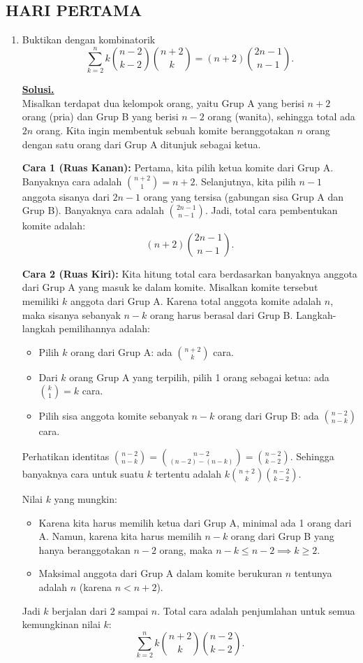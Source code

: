 \documentclass[12pt,twoside]{article}
\newenvironment{solution}
{
	\par\noindent\textbf{\underline{Solusi.}}\\
}
{
	\par
}
\begin{document}
\subsection{HARI PERTAMA}
\begin{enumerate}
  \item Buktikan dengan kombinatorik
        $$\sum_{k=2}^{n}k\binom{n-2}{k-2}\binom{n+2}{k}=(n+2)\binom{2n-1}{n-1}.$$
        \begin{solution}
          Misalkan terdapat dua kelompok orang, yaitu Grup A yang berisi $n+2$ orang (pria) dan Grup B yang berisi $n-2$ orang (wanita), sehingga total ada $2n$ orang. Kita ingin membentuk sebuah komite beranggotakan $n$ orang dengan satu orang dari Grup A ditunjuk sebagai ketua.

          \textbf{Cara 1 (Ruas Kanan):}
          Pertama, kita pilih ketua komite dari Grup A. Banyaknya cara adalah $\binom{n+2}{1} = n+2$.
          Selanjutnya, kita pilih $n-1$ anggota sisanya dari $2n-1$ orang yang tersisa (gabungan sisa Grup A dan Grup B). Banyaknya cara adalah $\binom{2n-1}{n-1}$.
          Jadi, total cara pembentukan komite adalah:
          \[ (n+2)\binom{2n-1}{n-1}. \]

          \textbf{Cara 2 (Ruas Kiri):}
          Kita hitung total cara berdasarkan banyaknya anggota dari Grup A yang masuk ke dalam komite. Misalkan komite tersebut memiliki $k$ anggota dari Grup A.
          Karena total anggota komite adalah $n$, maka sisanya sebanyak $n-k$ orang harus berasal dari Grup B.
          Langkah-langkah pemilihannya adalah:
          \begin{itemize}
            \item Pilih $k$ orang dari Grup A: ada $\binom{n+2}{k}$ cara.
            \item Dari $k$ orang Grup A yang terpilih, pilih 1 orang sebagai ketua: ada $\binom{k}{1} = k$ cara.
            \item Pilih sisa anggota komite sebanyak $n-k$ orang dari Grup B: ada $\binom{n-2}{n-k}$ cara.
          \end{itemize}
          Perhatikan identitas $\binom{n-2}{n-k} = \binom{n-2}{(n-2)-(n-k)} = \binom{n-2}{k-2}$.
          Sehingga banyaknya cara untuk suatu $k$ tertentu adalah $k \binom{n+2}{k} \binom{n-2}{k-2}$.

          Nilai $k$ yang mungkin:
          \begin{itemize}
            \item Karena kita harus memilih ketua dari Grup A, minimal ada 1 orang dari A. Namun, karena kita harus memilih $n-k$ orang dari Grup B yang hanya beranggotakan $n-2$ orang, maka $n-k \le n-2 \implies k \ge 2$.
            \item Maksimal anggota dari Grup A dalam komite berukuran $n$ tentunya adalah $n$ (karena $n < n+2$).
          \end{itemize}
          Jadi $k$ berjalan dari $2$ sampai $n$.
          Total cara adalah penjumlahan untuk semua kemungkinan nilai $k$:
          \[ \sum_{k=2}^{n} k \binom{n+2}{k} \binom{n-2}{k-2}. \]


\end{solution}
\end{enumerate}
\end{document}

